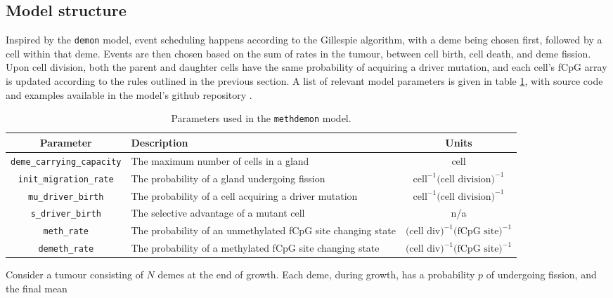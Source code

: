\subsection{Model structure}
Inspired by the \texttt{demon} model, event scheduling happens according to the
Gillespie algorithm, with a deme being chosen first, followed by a cell within
that deme. Events are then chosen based on the sum of rates in the tumour,
between cell birth, cell death, and deme fission. Upon cell division, both the
parent and daughter cells have the same probability of acquiring a driver
mutation, and each cell's fCpG array is updated according to the rules outlined
in the previous section. A list of relevant model parameters is given in table
\ref{table:methdemon_params}, with source code and examples available in the
model's github repository \cite{methdemon_repo}.
\begin{table}[h]
    \centering
    \begin{tabularx}{\textwidth}{|c|X|c|}
        \hline
        Parameter & Description & Units \\
        \hline
        \texttt{deme\_carrying\_capacity} & The maximum number of cells in a
        gland & cell \\
        \hline
        \texttt{init\_migration\_rate} & The probability of a gland undergoing
        fission & $\text{cell}^{-1}\text{(cell division)}^{-1}$\\
        \hline
        \texttt{mu\_driver\_birth} & The probability of a cell acquiring a
        driver mutation & $\text{cell}^{-1}\text{(cell division)}^{-1}$ \\
        \hline
        \texttt{s\_driver\_birth} & The selective advantage of a mutant
        cell & n/a \\
        \hline
        \texttt{meth\_rate} & The probability of an unmethylated fCpG site
        changing state & $\text{(cell div)}^{-1}\text{(fCpG site)}^{-1}$\\
        \hline
        \texttt{demeth\_rate} & The probability of a methylated fCpG site
        changing state & $\text{(cell div)}^{-1}\text{(fCpG site)}^{-1}$\\
        \hline
    \end{tabularx}
    \caption{Parameters used in the \texttt{methdemon} model.}
    \label{table:methdemon_params}
\end{table}
 Consider a tumour consisting of $N$ demes at the end of growth. Each deme,
 during growth, has a probability $p$ of undergoing fission, and the final mean
